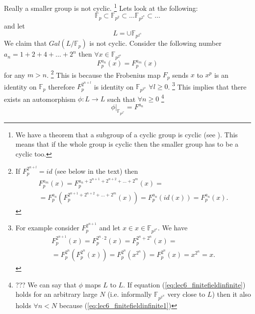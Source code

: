 Really a smaller group is not cyclic.
\footnote{
  We have a theorem that a subgroup of a cyclic group is cyclic
  (see ).
  This
  means that if the whole group is cyclic then the smaller group has
  to be a cyclic too.
}
Lets look at the following:
\[
\mathbb{F}_p \subset \mathbb{F}_{p^2} \subset \dots
\mathbb{F}_{p^{2^n}} \subset \dots
\]
and let
\[
L = \cup \mathbb{F}_{p^{2^n}}
\]
We claim that $Gal\left(L/\mathbb{F}_p\right)$ is not cyclic. Consider
the following number $a_n = 1+ 2 + 4 + \dots + 2^n$ then
$\forall x \in \mathbb{F}_{p^{2^n}}$
\begin{equation}
  F_p^{a_n}\left(x\right) = F_p^{a_m}\left(x\right)
  \label{eq:lec6_finitefieldinfinite1}
\end{equation}
for any $m > n$.
\footnote{
  If $F_p^{2^{n+l}} = id$ (see below in the text) then
  \begin{eqnarray} 
  F_p^{a_m}\left(x\right) = F_p^{a_n + 2^{n + 1} + 2^{n+2} + \dots +
    2^m}\left(x\right) =
  \nonumber \\
  = F_p^{a_n}\left(F_p^{2^{n + 1} + 2^{n+2} + \dots +
    2^m}\left(x\right)\right) =
  F_p^{a_n}\left(id\left(x\right)\right) =
  F_p^{a_n}\left(x\right).
  \nonumber
  \end{eqnarray}
}
This is because the Frobenius map $F_p$ sends $x$ to $x^p$ is an
identity on $\mathbb{F}_p$ therefore $F_p^{2^{n+l}}$ is identity on
$\mathbb{F}_{p^{2^n}}$ $\forall l \ge 0$.
\footnote{
  For example consider $F_p^{2^{n+1}}$ and let $x \in x
  \in \mathbb{F}_{p^{2^n}}$. We have
  \begin{eqnarray}
  F_p^{2^{n+1}}\left(x\right) =
  F_p^{2^n \cdot 2}\left(x\right) =
  F_p^{2^n + 2^n}\left(x\right) =
  \nonumber \\
  =
  F_p^{2^n}\left(F_p^{2^n}\left(x\right)\right) =
  F_p^{2^n}\left(x^{2^n}\right) =
  F_p^{2^n}\left(x\right) = x^{2^n} = x.
  \nonumber
  \end{eqnarray}
}
This implies
that
there exists an automorphism $\phi: L \to L$ such that
$\forall n \ge 0$
\footnote{
  ??? We can say that $\phi$ maps $L$ to $L$. If equation
  (\ref{eq:lec6_finitefieldinfinite}) holds for an arbitrary large $N$
  (i.e. informally $\mathbb{F}_{p^{2^N}}$ very
  close  to $L$)
  then it also holds $\forall n < N$ because
  (\ref{eq:lec6_finitefieldinfinite1})
}
\begin{equation}
  \left.\phi\right|_{\mathbb{F}_{p^{2^n}}} = F^{a_n}
  \label{eq:lec6_finitefieldinfinite}
\end{equation}
